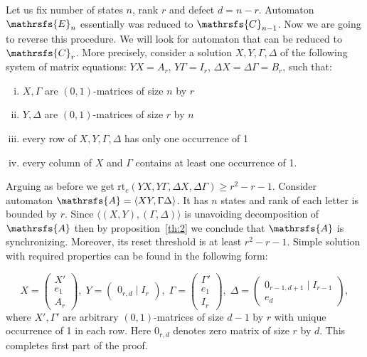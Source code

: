 \documentclass[11pt]{llncs}
\newcommand{\A}{\mathrsfs{A}}
\newcommand{\G}{\Gamma}
\newcommand{\D}{\Delta}
\newcommand{\rtc}{\mathrm{rt}_{c}}
\begin{document}
Let us fix number of states $n$, rank $r$ and defect $d = n - r$. Automaton $\mathrsfs{E}_n$ essentially was reduced to $\mathrsfs{C}_{n - 1}$.
Now we are going to reverse this procedure. We will look for automaton that can be reduced to $\mathrsfs{C}_r$.
More precisely, consider a solution $X,Y,\G,\D$ of the following system of matrix equations:
$YX = A_{r}$, $Y\G = I_{r}$, $\D X = \D \G = B_{r}$, such that:
\begin{enumerate}[(i)]
\item $X,\G$ are $(0,1)$-matrices of size $n$ by $r$
\item $Y,\D$ are $(0,1)$-matrices of size $r$ by $n$
\item every row of $X, Y, \G, \D$ has only one occurrence of 1
\item every column of $X$ and $\G$ contains at least one occurrence of 1.
\end{enumerate}
Arguing as before we get $\rtc(YX, Y\G, \D X, \D \G) \geq r^2 - r - 1$.
Consider automaton $\A = \langle XY, \G\D \rangle$. It has $n$ states and rank of each letter is bounded by $r$.
Since $\langle (X,Y), (\G, \D) \rangle$ is unavoiding decomposition of $\A$ then by proposition~\ref{th:2} we 
conclude that $\A$ is synchronizing.
Moreover, its reset threshold is at least $r^2 - r - 1$.
Simple solution with required properties can be found in the following form:

$$
X =
\left(
\begin{array}{c}
X' \\
e_1 \\
A_r
\end{array}
\right),\;
Y = 
\left(
\begin{array}{c}
0_{r,d} \mid I_r
\end{array}
\right),\;
\G = 
\left(
\begin{array}{c}
\G' \\
e_1 \\
I_r
\end{array}
\right),\;
\D = 
\left(
\begin{array}{c}
0_{r-1,d + 1} \mid I_{r-1}\\ \hline
e_d
\end{array}
\right),
$$
where $X', \G'$ are arbitrary $(0,1)$-matrices of size $d-1$ by $r$ with unique occurrence of 1
in each row. Here $0_{r,d}$ denotes zero matrix of size $r$ by $d$. This completes first part of the proof.
\end{document}
